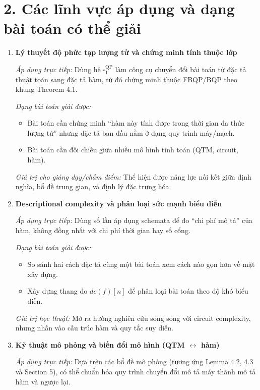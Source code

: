 \documentclass[12pt,a4paper]{article}
\begin{document}
\section*{2. Các lĩnh vực áp dụng và dạng bài toán có thể giải}
\begin{enumerate}[leftmargin=*,itemsep=0.9em]
\item \textbf{Lý thuyết độ phức tạp lượng tử và chứng minh tính thuộc lớp}

\textit{Áp dụng trực tiếp:} Dùng hệ $\square_{1}^{\mathrm{QP}}$ làm công cụ chuyển đổi bài toán từ đặc tả thuật toán sang đặc tả hàm, từ đó chứng minh thuộc FBQP/BQP theo khung Theorem 4.1.

\textit{Dạng bài toán giải được:}
\begin{itemize}[leftmargin=1.5em]
\item Bài toán cần chứng minh ``hàm này tính được trong thời gian đa thức lượng tử'' nhưng đặc tả ban đầu nằm ở dạng quy trình máy/mạch.
\item Bài toán cần đối chiếu giữa nhiều mô hình tính toán (QTM, circuit, hàm).
\end{itemize}

\textit{Giá trị cho giảng dạy/chấm điểm:} Thể hiện được năng lực nối kết giữa định nghĩa, bổ đề trung gian, và định lý đặc trưng hóa.

\item \textbf{Descriptional complexity và phân loại sức mạnh biểu diễn}

\textit{Áp dụng trực tiếp:} Dùng số lần áp dụng schemata để đo ``chi phí mô tả'' của hàm, không đồng nhất với chi phí thời gian hay số cổng.

\textit{Dạng bài toán giải được:}
\begin{itemize}[leftmargin=1.5em]
\item So sánh hai cách đặc tả cùng một bài toán xem cách nào gọn hơn về mặt xây dựng.
\item Xây dựng thang đo $dc(f)[n]$ để phân loại bài toán theo độ khó biểu diễn.
\end{itemize}

\textit{Giá trị học thuật:} Mở ra hướng nghiên cứu song song với circuit complexity, nhưng nhấn vào cấu trúc hàm và quy tắc suy diễn.

\item \textbf{Kỹ thuật mô phỏng và biến đổi mô hình (QTM $\leftrightarrow$ hàm)}

\textit{Áp dụng trực tiếp:} Dựa trên các bổ đề mô phỏng (tương ứng Lemma 4.2, 4.3 và Section 5), có thể chuẩn hóa quy trình chuyển đổi mô tả máy thành mô tả hàm và ngược lại.


\end{enumerate}
\end{document}
